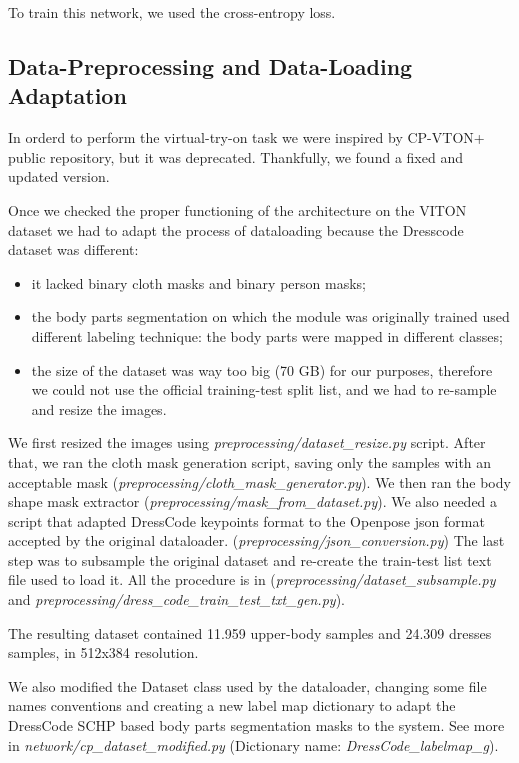 To train this network, we used the cross-entropy loss.



\subsection{Data-Preprocessing and Data-Loading Adaptation}
In orderd to perform the virtual-try-on task we were inspired by CP-VTON+ \cite{CP-VTON+} public repository, but it was deprecated. Thankfully, we found a fixed and updated version.


Once we checked the proper functioning of the architecture on the VITON dataset we had to adapt the process of dataloading because the Dresscode dataset was different:
\begin{itemize}
\item it lacked binary cloth masks and binary person masks;
\item the body parts segmentation on which the module was originally trained used different labeling technique: the body parts were mapped in different classes;
\item the size of the dataset was way too big (70 GB) for our purposes, therefore we could not use the official training-test split list, and we had to re-sample and resize the images.
\end{itemize}

We first resized the images using \textit{preprocessing/dataset\_resize.py} script. 
After that, we ran the cloth mask generation script, saving only the samples with an acceptable mask (\textit{preprocessing/cloth\_mask\_generator.py}).
We then ran the body shape mask extractor (\textit{preprocessing/mask\_from\_dataset.py}).
We also needed a script that adapted DressCode keypoints format to the Openpose json format accepted by the original dataloader. (\textit{preprocessing/json\_conversion.py})
The last step was to subsample the original dataset and re-create the train-test list text file used to load it. All the procedure is in (\textit{preprocessing/dataset\_subsample.py} and \textit{preprocessing/dress\_code\_train\_test\_txt\_gen.py}).

The resulting dataset contained 11.959 upper-body samples and 24.309 dresses samples, in 512x384 resolution. 

We also modified the Dataset class used by the dataloader, changing some file names conventions and creating a new label map dictionary to adapt the DressCode SCHP based body parts segmentation masks to the system. See more in \textit{network/cp\_dataset\_modified.py} (Dictionary name: \textit{DressCode\_labelmap\_g}).

